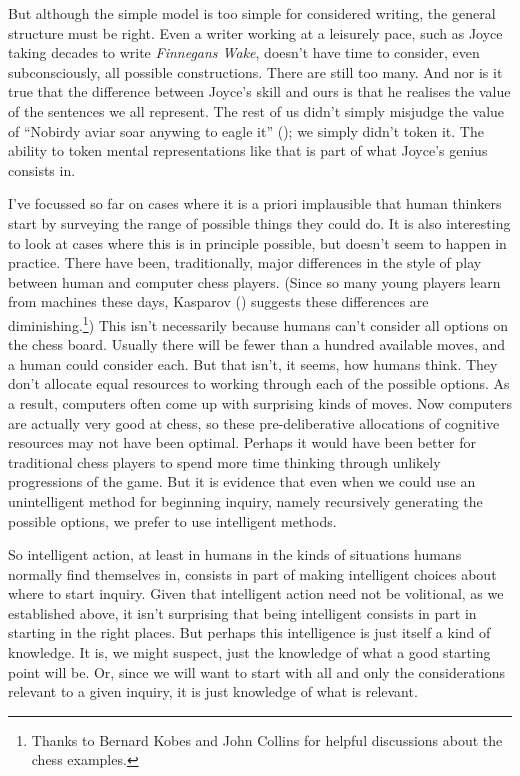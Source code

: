 \documentclass[
  10pt,
  letterpaper,
  DIV=11,
  numbers=noendperiod,
  twoside]{scrartcl}
\begin{document}
But although the simple model is too simple for considered writing, the
general structure must be right. Even a writer working at a leisurely
pace, such as Joyce taking decades to write \emph{Finnegans Wake},
doesn't have time to consider, even subconsciously, all possible
constructions. There are still too many. And nor is it true that the
difference between Joyce's skill and ours is that he realises the value
of the sentences we all represent. The rest of us didn't simply misjudge
the value of ``Nobirdy aviar soar anywing to eagle it''
(); we simply didn't token
it. The ability to token mental representations like that is part of
what Joyce's genius consists in.

I've focussed so far on cases where it is a priori implausible that
human thinkers start by surveying the range of possible things they
could do. It is also interesting to look at cases where this is in
principle possible, but doesn't seem to happen in practice. There have
been, traditionally, major differences in the style of play between
human and computer chess players. (Since so many young players learn
from machines these days, Kasparov ()
suggests these differences are diminishing.\footnote{Thanks to Bernard
  Kobes and John Collins for helpful discussions about the chess
  examples.}) This isn't necessarily because humans can't consider all
options on the chess board. Usually there will be fewer than a hundred
available moves, and a human could consider each. But that isn't, it
seems, how humans think. They don't allocate equal resources to working
through each of the possible options. As a result, computers often come
up with surprising kinds of moves. Now computers are actually very good
at chess, so these pre-deliberative allocations of cognitive resources
may not have been optimal. Perhaps it would have been better for
traditional chess players to spend more time thinking through unlikely
progressions of the game. But it is evidence that even when we could use
an unintelligent method for beginning inquiry, namely recursively
generating the possible options, we prefer to use intelligent methods.

So intelligent action, at least in humans in the kinds of situations
humans normally find themselves in, consists in part of making
intelligent choices about where to start inquiry. Given that intelligent
action need not be volitional, as we established above, it isn't
surprising that being intelligent consists in part in starting in the
right places. But perhaps this intelligence is just itself a kind of
knowledge. It is, we might suspect, just the knowledge of what a good
starting point will be. Or, since we will want to start with all and
only the considerations relevant to a given inquiry, it is just
knowledge of what is relevant.
\end{document}
